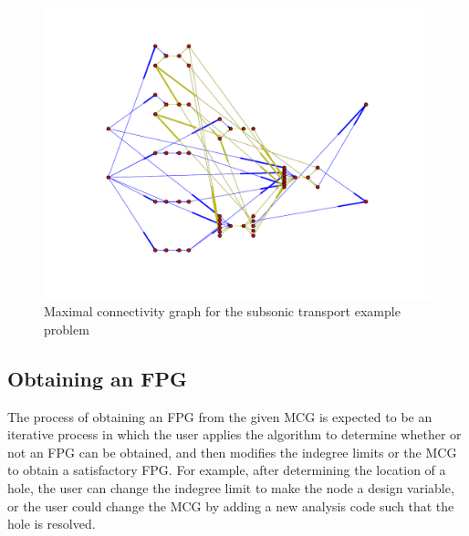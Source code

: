 	\begin{figure}[htb!]
	  \begin{center}
		\includegraphics[width=.6\textwidth]{images/MCG}
	  \end{center}
	  \caption{Maximal connectivity graph for the subsonic transport example problem}
	\end{figure}

\subsection{Obtaining an FPG}
	\label{ss:obtaining an FPG}
	The process of obtaining an FPG from the given MCG is expected to be an iterative process in which the user applies the algorithm to determine whether or not an FPG can be obtained, and then modifies the indegree limits or the MCG to obtain a satisfactory FPG. For example, after determining the location of a hole, the user can change the indegree limit to make the node a design variable, or the user could change the MCG by adding a new analysis code such that the hole is resolved.

